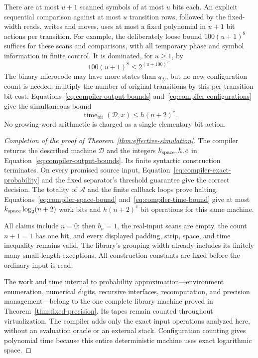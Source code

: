 \documentclass[11pt]{article}
\numberwithin{equation}{section}
\theoremstyle{definition}
\theoremstyle{remark}
\begin{document}
There are at most $u+1$ scanned symbols of at most $u$ bits each.
An explicit sequential comparison against at most $u$ transition rows,
followed by the fixed-width reads, writes and moves, uses at most a
fixed polynomial in $u+1$ bit actions per transition.  For example,
the deliberately loose bound $100(u+1)^8$ suffices for these scans
and comparisons, with all temporary phase and symbol information in
finite control.  It is dominated, for $u\ge1$, by
\[
 100(u+1)^8\le2^{(u+100)^2}.
\]
The binary microcode may have more states than $q_{\mathcal{D}}$, but no new
configuration count is needed: multiply the number of original
transitions by this per-transition bit cost.  Equations~\eqref{eq:compiler-output-bounds}
and~\eqref{eq:compiler-configurations} give the simultaneous bound
\begin{equation}\label{eq:compiler-time-bound}
 \operatorname{time}_{\mathrm{bit}}({\mathcal{D}},x)
 \le {h}(n+2)^c.
\end{equation}
No growing-word arithmetic is charged as a single elementary bit action.

\begin{proof}[Completion of the proof of Theorem~\ref{thm:effective-simulation}]
The compiler returns the described machine ${\mathcal{D}}$ and the integers
${k_{\rm space}},{h},c$ in Equation~\eqref{eq:compiler-output-bounds}.  Its finite
syntactic construction terminates.  On every promised source input,
Equation~\eqref{eq:compiler-exact-probability} and the fixed separator's
threshold guarantee give the correct decision.  The totality of ${\mathcal{A}}$
and the finite callback loops prove halting.  Equations~\eqref{eq:compiler-space-bound}
and~\eqref{eq:compiler-time-bound} give at most ${k_{\rm space}}\log_2(n+2)$
work bits and ${h}(n+2)^c$ bit operations for this same machine.

All claims include $n=0$: then ${b}_n=1$, the real-input scans are empty,
the count $n+1=1$ has one bit, and every displayed padding, strip,
space, and time inequality remains valid.  The library's grouping
width already includes its finitely many small-length exceptions.
All construction constants are fixed before the ordinary input is read.

The work and time internal to probability approximation---environment
enumeration, numerical digits, recursive interfaces, recomputation,
and precision management---belong to the one complete library machine
proved in Theorem~\ref{thm:fixed-precision}.  Its tapes remain counted
throughout virtualization.  The compiler adds only the exact input
operations analyzed here, without an evaluation oracle or an external
stack.  Configuration counting gives polynomial time because this
entire deterministic machine uses exact logarithmic space.
\end{proof}
\end{document}
